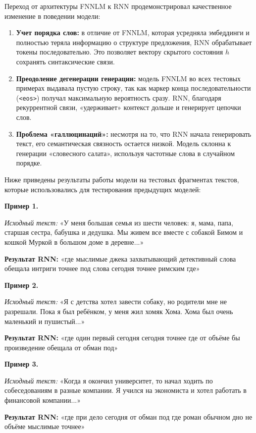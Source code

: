 \documentclass[coursework]{SCWorks}
\begin{document}
    Переход от архитектуры FNNLM к RNN продемонстрировал качественное изменение в поведении модели:
    \begin{enumerate}
        \item \textbf{Учет порядка слов:} в отличие от FNNLM, которая усредняла эмбеддинги и полностью теряла информацию о структуре предложения, RNN обрабатывает токены последовательно. Это позволяет вектору скрытого состояния $h$ сохранять синтаксические связи.
        \item \textbf{Преодоление дегенерации генерации:} модель FNNLM во всех тестовых примерах выдавала пустую строку, так как маркер конца последовательности (\texttt{<eos>}) получал максимальную вероятность сразу. RNN, благодаря рекуррентной связи, «удерживает» контекст дольше и генерирует цепочки слов.
        \item \textbf{Проблема «галлюцинаций»:} несмотря на то, что RNN начала генерировать текст, его семантическая связность остается низкой. Модель склонна к генерации «словесного салата», используя частотные слова в случайном порядке.
    \end{enumerate}

    Ниже приведены результаты работы модели на тестовых фрагментах текстов, которые использовались для тестирования предыдущих моделей:

    \textbf{Пример 1.}

    \textit{Исходный текст:} «У меня большая семья из шести человек: я, мама, папа, старшая сестра, бабушка и дедушка. Мы живем все вместе с собакой Бимом и кошкой Муркой в большом доме в деревне...»

    \textbf{Результат RNN:} «где мыслимые джека захватывающий детективный слова обещала интриги точнее под слова сегодня точнее римским где»

    \textbf{Пример 2.}

    \textit{Исходный текст:} «Я с детства хотел завести собаку, но родители мне не разрешали. Пока я был ребёнком, у меня жил хомяк Хома. Хома был очень маленький и пушистый...»

    \textbf{Результат RNN:} «где один первый сегодня сегодня точнее где от объёме бы произведение обещала от обман под»

    \textbf{Пример 3.}

    \textit{Исходный текст:} «Когда я окончил университет, то начал ходить по собеседованиям в разные компании. Я учился на экономиста и хотел работать в финансовой компании...»

    \textbf{Результат RNN:} «где при дело сегодня от обман под где роман обычном дно не объёме мыслимые точнее»
\end{document}
